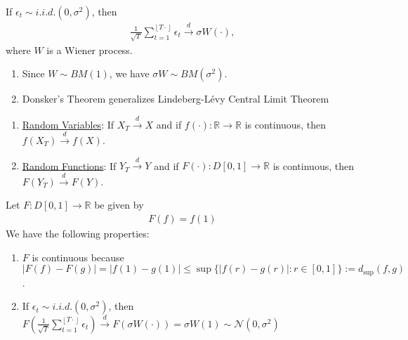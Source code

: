 \documentclass[11pt]{elegantbook}
\begin{document}
\begin{theorem}
    If $\epsilon_t\sim i.i.d.(0,\sigma^2)$, then
    \begin{equation}
        \begin{aligned}
            \frac{1}{\sqrt{T}}\sum_{t=1}^{\left\lfloor T\cdot\right\rfloor}\epsilon_t \stackrel{d}{\longrightarrow} \sigma W(\cdot),
        \end{aligned}
        \nonumber
    \end{equation}
    where $W$ is a Wiener process.
\end{theorem}
\begin{remark}
    \begin{enumerate}
        \item Since $W\sim BM(1)$, we have $\sigma W \sim BM(\sigma^2)$.
        \item Donsker's Theorem generalizes Lindeberg-Lévy Central Limit Theorem
    \end{enumerate}
\end{remark}

\begin{theorem}
    \begin{enumerate}
        \item \underline{Random Variables}: If $X_T \stackrel{d}{\longrightarrow} X$ and if $f(\cdot): \mathbb{R} \rightarrow \mathbb{R}$ is continuous, then $f(X_T) \stackrel{d}{\longrightarrow} f(X)$.
        \item \underline{Random Functions}: If $Y_T \stackrel{d}{\longrightarrow} Y$ and if $F(\cdot): D[0,1] \rightarrow \mathbb{R}$ is continuous, then $F(Y_T) \stackrel{d}{\longrightarrow} F(Y)$.
    \end{enumerate}
\end{theorem}
\begin{example}
    Let $F: D[0,1] \rightarrow \mathbb{R}$ be given by
    \begin{equation}
        \begin{aligned}
            F(f)=f(1)
        \end{aligned}
        \nonumber
    \end{equation}
    We have the following properties:
    \begin{enumerate}
        \item $F$ is continuous because $|F(f)-F(g)|=|f(1)-g(1)|\leq \sup\{|f(r)-g(r)|:r\in[0,1]\}:=d_{\sup}(f,g)$.
        \item If $\epsilon_t\sim i.i.d.(0,\sigma^2)$, then $F(\frac{1}{\sqrt{T}}\sum_{t=1}^{\left\lfloor T\cdot\right\rfloor}\epsilon_t)\stackrel{d}{\longrightarrow} F(\sigma W(\cdot))=\sigma W(1)\sim \mathcal{N}(0,\sigma^2)$
    \end{enumerate}
\end{example}

















\appendix

\end{document}
